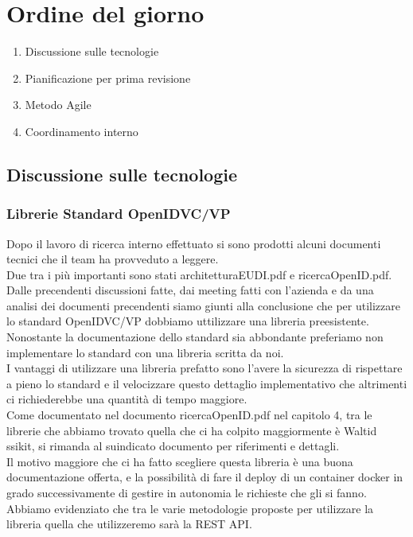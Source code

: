 \section{Ordine del giorno}
\begin{enumerate}
\item Discussione sulle tecnologie 
\item Pianificazione per prima revisione
\item Metodo Agile
\item Coordinamento interno 
\end{enumerate}

\subsection{Discussione sulle tecnologie}
\subsubsection{Librerie Standard OpenIDVC/VP}
Dopo il lavoro di ricerca interno effettuato si sono prodotti alcuni documenti tecnici che il team ha provveduto a leggere.\\
Due tra i più importanti sono stati architetturaEUDI.pdf e ricercaOpenID.pdf.\\
Dalle precendenti discussioni fatte, dai meeting fatti con l'azienda e da una analisi dei documenti precendenti siamo giunti alla 
conclusione che per utilizzare lo standard OpenIDVC/VP dobbiamo uttilizzare una libreria preesistente.\\
Nonostante la documentazione dello standard sia abbondante preferiamo non implementare lo standard con una libreria scritta da noi.\\
I vantaggi di utilizzare una libreria prefatto sono l'avere la sicurezza di rispettare a pieno lo standard e il velocizzare questo dettaglio implementativo che altrimenti ci richiederebbe una quantità di tempo maggiore.\\
Come documentato nel documento ricercaOpenID.pdf nel capitolo 4, tra le librerie che abbiamo trovato quella che ci ha colpito maggiormente è
Waltid ssikit, si rimanda al suindicato documento per riferimenti e dettagli.\\
Il motivo maggiore che ci ha fatto scegliere questa libreria è una buona documentazione offerta, e la possibilità di fare il deploy di un container docker in grado successivamente di
gestire in autonomia le richieste che gli si fanno.\\
Abbiamo evidenziato che tra le varie metodologie proposte per utilizzare la libreria quella che utilizzeremo sarà la REST API.
